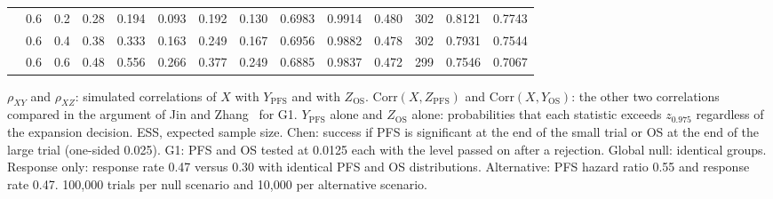 \begin{table}[htbp]
\begin{threeparttable}
\begin{tabular}{lrrrrrrrrrrrrr}
 & 0.6 & 0.2 & 0.28 & 0.194 & 0.093 & 0.192 & 0.130 & 0.6983 & 0.9914 & 0.480 & 302 & 0.8121 & 0.7743 \\
 & 0.6 & 0.4 & 0.38 & 0.333 & 0.163 & 0.249 & 0.167 & 0.6956 & 0.9882 & 0.478 & 302 & 0.7931 & 0.7544 \\
 & 0.6 & 0.6 & 0.48 & 0.556 & 0.266 & 0.377 & 0.249 & 0.6885 & 0.9837 & 0.472 & 299 & 0.7546 & 0.7067 \\
\bottomrule
\end{tabular}
\begin{tablenotes}
\footnotesize
\item $\rho_{XY}$ and $\rho_{XZ}$: simulated correlations of $X$ with $Y_{\mathrm{PFS}}$ and with $Z_{\mathrm{OS}}$. $\mathrm{Corr}(X, Z_{\mathrm{PFS}})$ and $\mathrm{Corr}(X, Y_{\mathrm{OS}})$: the other two correlations compared in the argument of Jin and Zhang~\cite{Jin2021} for G1. $Y_{\mathrm{PFS}}$ alone and $Z_{\mathrm{OS}}$ alone: probabilities that each statistic exceeds $z_{0.975}$ regardless of the expansion decision. ESS, expected sample size. Chen: success if PFS is significant at the end of the small trial or OS at the end of the large trial (one-sided 0.025). G1: PFS and OS tested at 0.0125 each with the level passed on after a rejection. Global null: identical groups. Response only: response rate 0.47 versus 0.30 with identical PFS and OS distributions. Alternative: PFS hazard ratio 0.55 and response rate 0.47. 100,000 trials per null scenario and 10,000 per alternative scenario.
\end{tablenotes}
\end{threeparttable}
\end{table}
